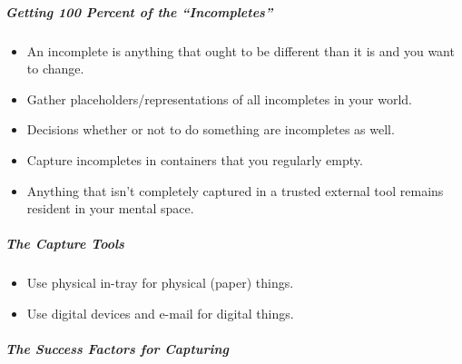 \documentclass{article}
\begin{document}
\subparagraph{Getting 100 Percent of the ``Incompletes''}

\begin{itemize}
  \item An incomplete is anything that ought to be different than it is and you want to change.
  \item Gather placeholders/representations of all incompletes in your world.
  \item Decisions whether or not to do something are incompletes as well.
  \item Capture incompletes in containers that you regularly empty.
  \item Anything that isn't completely captured in a trusted external tool remains resident in your mental space.
\end{itemize}

\subparagraph{The Capture Tools}

\begin{itemize}
  \item Use physical in-tray for physical (paper) things.
  \item Use digital devices and e-mail for digital things.
\end{itemize}

\subparagraph{The Success Factors for Capturing}
\end{document}
